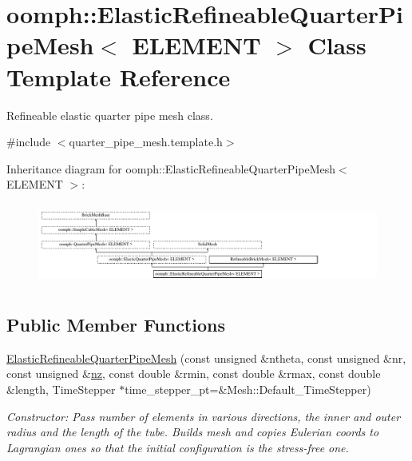 \hypertarget{classoomph_1_1ElasticRefineableQuarterPipeMesh}{}\section{oomph\+:\+:Elastic\+Refineable\+Quarter\+Pipe\+Mesh$<$ E\+L\+E\+M\+E\+NT $>$ Class Template Reference}
\label{classoomph_1_1ElasticRefineableQuarterPipeMesh}


Refineable elastic quarter pipe mesh class.  




{\ttfamily \#include $<$quarter\+\_\+pipe\+\_\+mesh.\+template.\+h$>$}

Inheritance diagram for oomph\+:\+:Elastic\+Refineable\+Quarter\+Pipe\+Mesh$<$ E\+L\+E\+M\+E\+NT $>$\+:\begin{figure}[H]
\begin{center}
\leavevmode
\includegraphics[height=2.729045cm]{classoomph_1_1ElasticRefineableQuarterPipeMesh}
\end{center}
\end{figure}
\subsection*{Public Member Functions}
\begin{DoxyCompactItemize}
\item 
\hyperlink{classoomph_1_1ElasticRefineableQuarterPipeMesh_a5d90778b3a060b97353b5d9ff5a9dd3d}{Elastic\+Refineable\+Quarter\+Pipe\+Mesh} (const unsigned \&ntheta, const unsigned \&nr, const unsigned \&\hyperlink{classoomph_1_1SimpleCubicMesh_ad78725440e4e87598fd9339653b28e61}{nz}, const double \&rmin, const double \&rmax, const double \&length, Time\+Stepper $\ast$time\+\_\+stepper\+\_\+pt=\&Mesh\+::\+Default\+\_\+\+Time\+Stepper)
\begin{DoxyCompactList}\small\item\em Constructor\+: Pass number of elements in various directions, the inner and outer radius and the length of the tube. Builds mesh and copies Eulerian coords to Lagrangian ones so that the initial configuration is the stress-\/free one. \end{DoxyCompactList}\end{DoxyCompactItemize}
